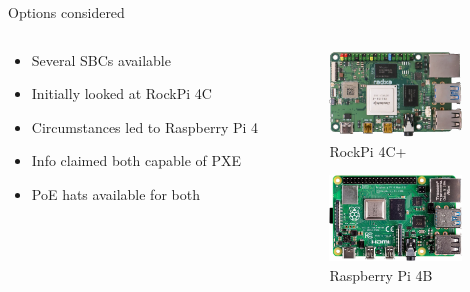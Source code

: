 \begin{frame}{Options considered}
	\begin{columns}
		\begin{column}{0.5\textwidth}
			\begin{itemize}[label={$\color{UmUBlue}\bullet$}]
				\item Several SBCs available
				\item Initially looked at RockPi 4C
				\item Circumstances led to Raspberry Pi 4
				\item Info claimed both capable of PXE
				\item PoE hats available for both
			\end{itemize}
		\end{column}
		\begin{column}{0.5\textwidth}
			\begin{figure}
				\includegraphics[width=3.5cm]{graphics/rock4c+.png}
				\caption{RockPi 4C+}
			\end{figure}
			\begin{figure}
				\includegraphics[width=3.5cm]{graphics/rasp4b.jpg}
				\caption{Raspberry Pi 4B}
			\end{figure}
		\end{column}
	\end{columns}
\end{frame}
